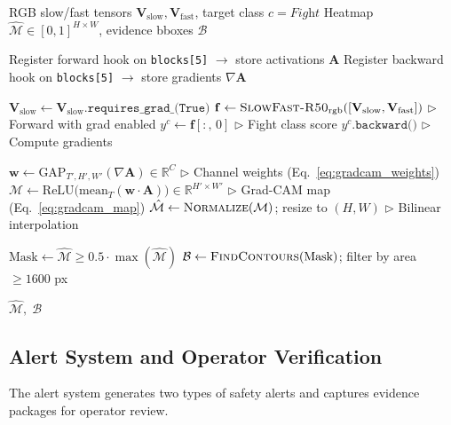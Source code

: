 \documentclass[11pt,a4paper]{article}
\newcommand{\R}{\mathbb{R}}
\newcommand{\relu}{\mathrm{ReLU}}
\begin{document}
\begin{algorithm}[H]
\caption{Grad-CAM: Spatial Evidence Localization}\label{alg:gradcam}
\begin{algorithmic}[1]
\Require RGB slow/fast tensors $\mathbf{V}_{\text{slow}}, \mathbf{V}_{\text{fast}}$, target class $c = \textit{Fight}$
\Ensure Heatmap $\hat{\mathcal{M}} \in [0,1]^{H \times W}$, evidence bboxes $\mathcal{B}$

\State Register forward hook on \texttt{blocks[5]} $\to$ store activations $\mathbf{A}$
\State Register backward hook on \texttt{blocks[5]} $\to$ store gradients $\nabla\mathbf{A}$

\State $\mathbf{V}_{\text{slow}} \gets \mathbf{V}_{\text{slow}}.\texttt{requires\_grad\_(True)}$
\State $\mathbf{f} \gets \textsc{SlowFast-R50}_{\text{rgb}}([\mathbf{V}_{\text{slow}}, \mathbf{V}_{\text{fast}}])$ \hfill $\triangleright$ Forward with grad enabled
\State $y^c \gets \mathbf{f}[:,\, 0]$ \hfill $\triangleright$ Fight class score
\State $y^c.\texttt{backward()}$ \hfill $\triangleright$ Compute gradients

\State $\mathbf{w} \gets \text{GAP}_{T',H',W'}(\nabla\mathbf{A}) \in \R^{C}$ \hfill $\triangleright$ Channel weights (Eq.~\eqref{eq:gradcam_weights})
\State $\mathcal{M} \gets \relu\!\bigl(\text{mean}_T(\mathbf{w} \cdot \mathbf{A})\bigr) \in \R^{H' \times W'}$ \hfill $\triangleright$ Grad-CAM map (Eq.~\eqref{eq:gradcam_map})
\State $\hat{\mathcal{M}} \gets \textsc{Normalize}(\mathcal{M})$; resize to $(H, W)$ \hfill $\triangleright$ Bilinear interpolation

\State $\text{Mask} \gets \hat{\mathcal{M}} \geq 0.5 \cdot \max(\hat{\mathcal{M}})$
\State $\mathcal{B} \gets \textsc{FindContours}(\text{Mask})$; filter by area $\geq 1600$ px

\State \Return $\hat{\mathcal{M}},\; \mathcal{B}$
\end{algorithmic}
\end{algorithm}


\subsection{Alert System and Operator Verification}
\label{subsec:alert}

The alert system generates two types of safety alerts and captures evidence packages for operator review.
\end{document}
